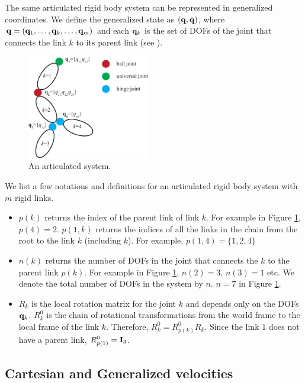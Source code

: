 The same articulated rigid body system can be represented in
generalized coordinates. We define the generalized state as $(\mathbf{q},\dot{\mathbf{q}})$, where $\mathbf{q} = (\mathbf{q}_1,\hdots,\mathbf{q}_k,\hdots,\mathbf{q}_m)$ and each $\mathbf{q}_k$ is the set of DOFs of the joint that connects the link $k$ to its parent link (see ). 

\begin{figure}
 \vspace{20pt}
\begin{center}
\includegraphics[width=2.1in]{example1_new.eps}
\end{center}
\caption{An articulated system.}
 \vspace{0pt}
\label{fig:example1}
\end{figure}

We list a few notations and definitions for an articulated rigid body system with $m$ rigid links. 
\begin{itemize}
\item $p(k)$ returns the index of the parent link of link $k$. For
  example in Figure \ref{fig:example1}, $p(4) = 2$. $p(1,k)$ returns the indices of all the links in the chain from the root to the link $k$ (including $k$). For example, $p(1,4) = \{1,2,4\}$
\item $n(k)$ returns the number of DOFs in the joint that connects the $k$ to the parent link $p(k)$. For example in Figure \ref{fig:example1}, $n(2) = 3$, $n(3) = 1$ etc. We denote the total number of DOFs in the system by $n$. \eg $n=7$ in Figure \ref{fig:example1}.
\item $R_k$ is the local rotation matrix for the joint $k$ and depends only on the DOFs $\mathbf{q}_k$. $R^0_k$ is the chain of rotational transformations from the
  world frame to the local frame of the link $k$. Therefore, $R^0_k = R^0_{p(k)}R_k$. Since the link $1$ does not have a parent link, $R^0_{p(1)} = \mathbf{I}_3$.
\end{itemize}



\subsection{Cartesian and Generalized velocities}

